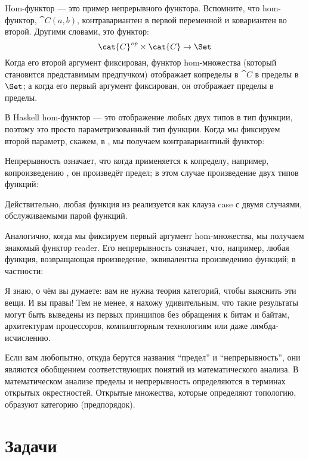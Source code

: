 Hom-функтор --- это пример непрерывного функтора. Вспомните, что
hom-функтор, $\cat{C}(a, b)$, контравариантен в первой переменной
и ковариантен во второй. Другими словами, это функтор:
\[\cat{C}^\mathit{op} \times \cat{C} \to \Set\]
Когда его второй аргумент фиксирован, функтор hom-множества (который становится
представимым предпучком) отображает копределы в $\cat{C}$ в пределы в
$\Set$; а когда его первый аргумент фиксирован, он отображает пределы в
пределы.

В Haskell hom-функтор --- это отображение любых двух типов в тип функции,
поэтому это просто параметризованный тип функции. Когда мы фиксируем второй
параметр, скажем, в , мы получаем контравариантный
функтор:

Непрерывность означает, что когда  применяется к копределу,
например, копроизведению , он произведёт предел;
в этом случае произведение двух типов функций:

Действительно, любая функция из  реализуется как клауза
case с двумя случаями, обслуживаемыми парой функций.

Аналогично, когда мы фиксируем первый аргумент hom-множества, мы получаем
знакомый функтор reader. Его непрерывность означает, что, например, любая
функция, возвращающая произведение, эквивалентна произведению функций; в
частности:

Я знаю, о чём вы думаете: вам не нужна теория категорий, чтобы выяснить
эти вещи. И вы правы! Тем не менее, я нахожу удивительным, что такие
результаты могут быть выведены из первых принципов без обращения к битам
и байтам, архитектурам процессоров, компиляторным технологиям или даже
лямбда-исчислению.

Если вам любопытно, откуда берутся названия ``предел'' и ``непрерывность'',
они являются обобщением соответствующих понятий из
математического анализа. В математическом анализе пределы и непрерывность определяются в терминах открытых
окрестностей. Открытые множества, которые определяют топологию, образуют категорию (предпорядок).

\section{Задачи}

